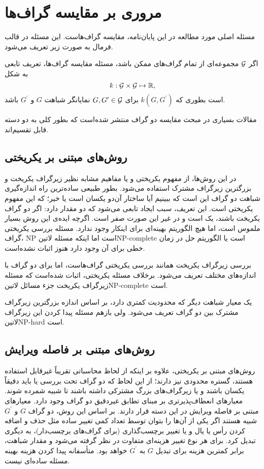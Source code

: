 \section{مروری بر مقایسه گراف‌ها}\label{sec:graph_comparison}
مسئله اصلی مورد مطالعه در این پایان‌نامه، مقایسه گراف‌هاست. این مسئله در قالب فرمال به صورت زیر تعریف می‌شود.

\begin{definition}
اگر $\mathcal{G}$ مجموعه‌ای از تمام گراف‌های ممکن باشد، مسئله مقایسه گراف‌ها، تعریف تابعی به شکل
\begin{equation*}
k:\mathcal{G} \times \mathcal{G} \mapsto \mathbb{R},
\end{equation*}
است بطوری که $k(G,G^\prime)$ برای $G,G^\prime \in \mathcal{G}$ نمایانگر شباهت $G$ و $G^\prime$ باشد.
\end{definition}
مقالات بسیاری در مبحث مقایسه دو گراف منتشر شده‌است که بطور کلی به دو دسته قابل تقسیم‌اند.

\subsection{روش‌های مبتنی بر یکریختی}
در این روش‌ها، از مفهوم یکریختی و یا مفاهیم مشابه نظیر زیرگراف یکریخت و بزرگترین زیرگراف مشترک استفاده می‌شود. بطور طبیعی ساده‌ترین راه اندازه‌گیری شباهت دو گراف این است که ببینیم آیا ساختار آن‌دو یکسان است یا خیر؛ که این مفهوم یکریختی است. این تعریف، سبب ایجاد تابعی می‌شود که دو مقدار دارد: اگر دو گراف یکریخت باشند، یک است و در غیر این صورت صفر است. اگرچه ایده‌ی این روش بسیار ملموس است، اما هیچ الگوریتم بهینه‌ای برای اینکار وجود ندارد. مسئله بررسی یکریختی گراف، NP‌ است اما اینکه مسئله ‌لاتین{NP-complete} است یا الگوریتم حل در زمان خطی برای آن وجود دارد هنوز اثبات نشده‌است.

بررسی زیرگراف یکریخت همانند بررسی یکریختی گراف‌هاست، اما برای دو گراف با اندازه‌های مختلف تعریف می‌شود. برخلاف مسئله یکریختی، اثبات شده‌است که مسئله زیرگراف یکریخت جزء مسائل ‌لاتین{NP-complete} است.

یک معیار شباهت دیگر که محدودیت کمتری دارد، بر اساس اندازه بزرگترین زیرگراف مشترک بین دو گراف تعریف می‌شود. ولی بازهم مسئله پیدا کردن این زیرگراف ‌لاتین{NP-hard} است.

\subsection{روش‌های مبتنی بر فاصله ویرایش}
روش‌های مبتنی بر یکریختی، علاوه بر اینکه از لحاظ محاسباتی تقریباً غیرقابل استفاده هستند، گستره محدودی نیز دارند؛ از این لحاظ که دو گراف تحت بررسی یا باید دقیقاً یکسان باشند و یا زیرگراف‌های بزرگ مشترکی داشته باشند تا شبیه شمرده شوند. معیارهای انعطاف‌پذیرتری بر مبنای تطابق غیردقیق دو گراف وجود دارد. معیارهای مبتنی بر فاصله ویرایش در این دسته قرار دارند. بر اساس این روش، دو گراف $G$ و $G^\prime$ شبیه هستند اگر یکی از آن‌ها را بتوان توسط تعداد کمی تغییر ساده مثل حذف و اضافه کردن رأس یا یال و یا تغییر برچسب‌گذاری (برای گراف‌های برچسب‌دار)، به دیگری تبدیل کرد. برای هر نوع تغییر هزینه‌‌ای متفاوت در نظر گرفته می‌شود و مقدار شباهت، برابر کمترین هزینه برای تبدیل $G$ به $G^\prime$ خواهد بود. متأسفانه پیدا کردن هزینه بهینه مسئله ساده‌ای نیست.

